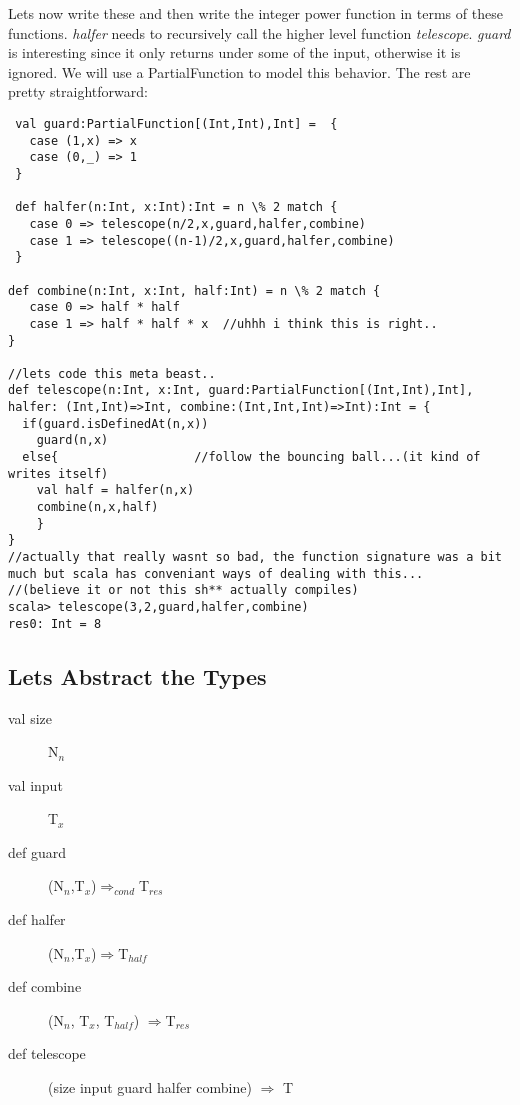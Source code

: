 \documentclass[12pt]{article}
\begin{document}
Lets now write these and then write the integer power function in terms of these functions. \textit{halfer} needs to recursively call the higher level function \textit{telescope}.
\textit{guard} is interesting since it only returns under some of the input, otherwise it is ignored. We will use a PartialFunction to model this behavior. The rest are pretty straightforward:
\begin{lstlisting}
 val guard:PartialFunction[(Int,Int),Int] =  {
   case (1,x) => x
   case (0,_) => 1
 }

 def halfer(n:Int, x:Int):Int = n \% 2 match {
   case 0 => telescope(n/2,x,guard,halfer,combine)
   case 1 => telescope((n-1)/2,x,guard,halfer,combine)
 } 

def combine(n:Int, x:Int, half:Int) = n \% 2 match {
   case 0 => half * half
   case 1 => half * half * x  //uhhh i think this is right..
}

//lets code this meta beast..
def telescope(n:Int, x:Int, guard:PartialFunction[(Int,Int),Int], halfer: (Int,Int)=>Int, combine:(Int,Int,Int)=>Int):Int = {
  if(guard.isDefinedAt(n,x))
    guard(n,x)
  else{                   //follow the bouncing ball...(it kind of writes itself)
    val half = halfer(n,x)
    combine(n,x,half)
    }
}
//actually that really wasnt so bad, the function signature was a bit much but scala has conveniant ways of dealing with this...
//(believe it or not this sh** actually compiles)
scala> telescope(3,2,guard,halfer,combine)
res0: Int = 8
\end{lstlisting}

\subsection{Lets Abstract the Types}
\begin{description}
\item[val size]   N$_{n}$
\item[val input]  T$_{x}$
\item[def guard]  (N$_{n}$,T$_{x}$)$\Rightarrow_{cond}$T$_{res}$
\item[def halfer] (N$_{n}$,T$_{x}$)$\Rightarrow$T$_{half}$
\item[def combine] (N$_{n}$, T$_{x}$, T$_{half}$) $\Rightarrow$T$_{res}$
\item[def telescope] (size input guard halfer combine) $\Rightarrow$ T
\end{description}
\end{document}
